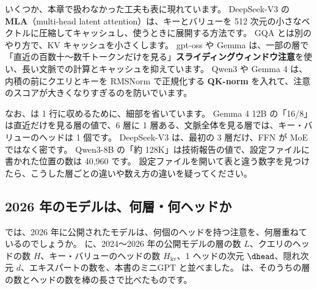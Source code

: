 いくつか、本章で扱わなかった工夫も表に現れています。
DeepSeek-V3 の \textbf{MLA}（multi-head latent attention）は、キーとバリューを 512 次元の小さなベクトルに圧縮してキャッシュし、使うときに展開する方法です。
GQA とは別のやり方で、KV キャッシュを小さくします\cite{liu2024deepseekv3}。
gpt-oss や Gemma は、一部の層で「直近の百数十〜数千トークンだけを見る」\textbf{スライディングウィンドウ注意}を使い、長い文脈での計算とキャッシュを抑えています。
Qwen3 や Gemma 4 は、内積の前にクエリとキーを RMSNorm で正規化する \textbf{QK-norm} を入れて、注意のスコアが大きくなりすぎるのを防いでいます。

なお、は 1 行に収めるために、細部を省いています。
Gemma 4 12B の「16/8」は直近だけを見る層の値で、6 層に 1 層ある、文脈全体を見る層では、キー・バリューのヘッドは 1 個です。
DeepSeek-V3 は、最初の 3 層だけ、FFN が MoE ではなく密です。
Qwen3-8B の「約 128K」は技術報告の値で、設定ファイルに書かれた位置の数は 40,960 です。
設定ファイルを開いて表と違う数字を見つけたら、こうした層ごとの違いや数え方の違いを疑ってください。

\subsection*{2026 年のモデルは、何層・何ヘッドか}

では、2026 年に公開されたモデルは、何個のヘッドを持つ注意を、何層重ねているのでしょうか。
に、2024〜2026 年の公開モデルの層の数 $L$、クエリのヘッドの数 $H$、キー・バリューのヘッドの数 $H_{\mathrm{kv}}$、1 ヘッドの次元 $\dhead$、隠れ次元 $d$、エキスパートの数を、本書のミニGPT と並べました。
は、そのうちの層の数とヘッドの数を棒の長さで比べたものです。


